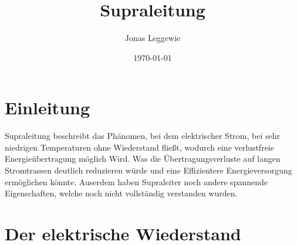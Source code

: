 \documentclass[a4paper,12pt]{article}
\title{Supraleitung}
\author{Jonas Leggewie}
\date{\today}
\begin{document}
\maketitle
\newpage
\tableofcontents
\newpage


\section{Einleitung}
Supraleitung beschreibt das Phänomen, bei dem elektrischer Strom, bei sehr niedrigen Temperaturen 
ohne Wiederstand fließt, wodurch eine verlustfreie Energieübertragung möglich Wird. Was die 
Übertragungsverluste auf langen Stromtrassen deutlich reduzieren würde und eine Effizientere 
Energieversorgung ermöglichen könnte. Auserdem haben Supraleiter noch andere spannende 
Eigenschaften, welche noch nicht vollständig verstanden wurden. 

\section{Der elektrische Wiederstand}
\end{document}
